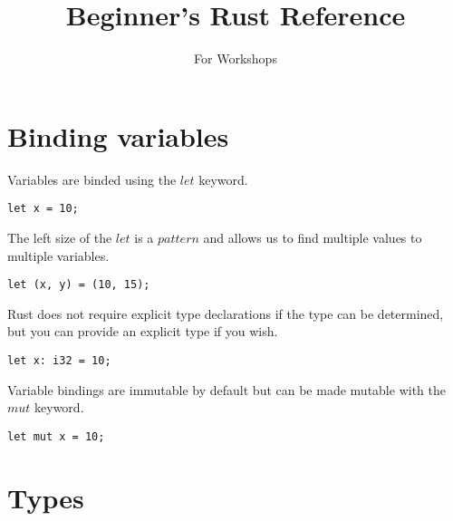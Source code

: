 \documentclass[a0,final]{a0poster}
\title{Beginner's Rust Reference}
\author{For Workshops}
\begin{document}
\begin{minipage}{\textwidth}					%
\maketitle
\end{minipage}
\vspace{1cm}

\begin{multicols}{3}							%
\raggedcolumns							%

\section*{Binding variables}

Variables are binded using the $let$ keyword.

\begin{verbatim}
let x = 10;
\end{verbatim}

The left size of the $let$ is a $pattern$ and allows us to find multiple values to multiple variables.

\begin{verbatim}
let (x, y) = (10, 15);
\end{verbatim}

Rust does not require explicit type declarations if the type can be determined, but you can provide an explicit type if you wish.

\begin{verbatim}
let x: i32 = 10;
\end{verbatim}

Variable bindings are immutable by default but can be made mutable with the $mut$ keyword.

\begin{verbatim}
let mut x = 10;
\end{verbatim}

\section*{Types}


\end{multicols}
\end{document}
